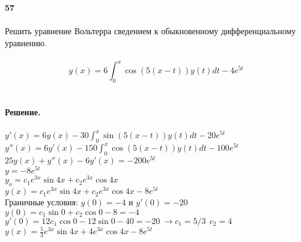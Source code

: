 \documentclass[10pt,a4paper]{article}
\begin{document}
	\noindent\textbf{57} \\ \\
	Решить уравнение Вольтерра сведением к обыкновенному дифференциальному уравнению.\\ \\
	$$y(x)=6\int_{0}^{x}\cos(5(x-t))y(t)dt-4e^{5t}$$\\ \\
	\textbf{Решение.} \\ \\
	$y'(x)=6y(x)-30\int_{0}^{x}\sin(5(x-t))y(t)dt-20e^{5t}$\\
	$y''(x)=6y'(x)-150\int_{0}^{x}\cos(5(x-t))y(t)dt-100e^{5t}$\\
	$25y(x)+y''(x)-6y'(x)=-200e^{5t}$\\
	$y=-8e^{5t}$\\
	$y_{o}=c_1e^{3x}\sin4x+c_2e^{3x}\cos4x$\\
	$y(x)=c_1e^{3x}\sin4x+c_2e^{3x}\cos4x-8e^{5t}$\\
	Граничные условия:
	$y(0)=-4$ и $y'(0)=-20$\\
	$y(0)=c_1\sin0+c_2\cos0-8=-4$\\
	$y'(0)=12c_1\cos0-12\sin0-40=-20\ \rightarrow c_1=5/3\ \ c_2=4$\\
	$y(x)=\frac{5}{3}e^{3x}\sin4x+4e^{3x}\cos4x-8e^{5t}$ \\ \\ 
\end{document}
